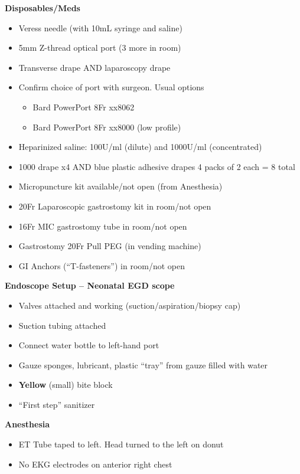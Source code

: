 \documentclass[
]{book}
\providecommand{\tightlist}{%
  \setlength{\itemsep}{0pt}\setlength{\parskip}{0pt}}
\begin{document}
\textbf{Disposables/Meds}

\begin{itemize}
\tightlist
\item
  Veress needle (with 10mL syringe and saline)
\item
  5mm Z-thread optical port (3 more in room)
\item
  Transverse drape AND laparoscopy drape
\item
  Confirm choice of port with surgeon. Usual options

  \begin{itemize}
  \tightlist
  \item
    Bard PowerPort 8Fr xx8062
  \item
    Bard PowerPort 8Fr xx8000 (low profile)
  \end{itemize}
\item
  Heparinized saline: 100U/ml (dilute) and 1000U/ml (concentrated)
\item
  1000 drape x4 AND blue plastic adhesive drapes 4 packs of 2 each = 8 total
\item
  Micropuncture kit available/not open (from Anesthesia)
\item
  20Fr Laparoscopic gastrostomy kit in room/not open
\item
  16Fr MIC gastrostomy tube in room/not open
\item
  Gastrostomy 20Fr Pull PEG (in vending machine)
\item
  GI Anchors (``T-fasteners'') in room/not open
\end{itemize}

\textbf{Endoscope Setup -- Neonatal EGD scope}

\begin{itemize}
\tightlist
\item
  Valves attached and working (suction/aspiration/biopsy cap)
\item
  Suction tubing attached
\item
  Connect water bottle to left-hand port
\item
  Gauze sponges, lubricant, plastic ``tray'' from gauze filled with water
\item
  \textbf{Yellow} (small) bite block
\item
  ``First step'' sanitizer
\end{itemize}

\textbf{Anesthesia}

\begin{itemize}
\tightlist
\item
  ET Tube taped to left. Head turned to the left on donut
\item
  No EKG electrodes on anterior right chest
\end{itemize}
\end{document}
